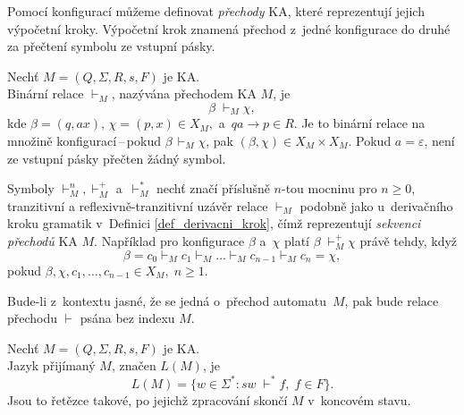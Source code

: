 Pomocí konfigurací můžeme definovat \emph{přechody} KA, které reprezentují jejich výpočetní kroky.
Výpočetní krok znamená přechod z~jedné konfigurace do druhé za přečtení symbolu ze vstupní pásky.
\begin{definition}\label{def_prechod_ka}
    Nechť $M = (Q, \Sigma, R, s, F)$ je KA.\\
    Binární relace $\vdash_{\scriptscriptstyle M}$, nazývána přechodem KA $M$, je
    \begin{equation*}
        \beta\; \vdash_{\scriptscriptstyle M}\chi,
    \end{equation*}
    kde $\beta = (q, ax),\, \chi = (p, x) \in X_M,$ a~$qa \rightarrow p \in R$.
    Je to binární relace na množině konfigurací\,--\,pokud $\beta\, \vdash_{\scriptscriptstyle M} \chi$, pak $(\beta, \chi) \in X_M \times X_M$.
    Pokud $a = \varepsilon$, není ze vstupní pásky přečten žádný symbol.
    
    Symboly $\vdash_{\scriptscriptstyle M}^n, \vdash_{\scriptscriptstyle M}^+$ a~$\vdash_{\scriptscriptstyle M}^*$ nechť značí příslušně $n$-tou mocninu pro $n \geq 0$, tranzitivní a reflexivně-tranzitivní uzávěr relace $\vdash_{\scriptscriptstyle M}$ podobně jako u~derivačního kroku gramatik v~Definici \ref{def_derivacni_krok}, čímž reprezentují \emph{sekvenci přechodů} KA $M$.
    Například pro konfigurace $\beta$ a~$\chi$ platí $\beta\; \vdash_{\scriptscriptstyle M}^+ \chi$ právě tehdy, když
    \begin{equation*}
        \beta = c_0 \vdash_{\scriptscriptstyle M} c_1 \vdash_{\scriptscriptstyle M} \ldots \vdash_{\scriptscriptstyle M} c_{n-1} \vdash_{\scriptscriptstyle M} c_{n} = \chi,
    \end{equation*}
    pokud $\beta, \chi, c_1, \ldots, c_{n-1} \in X_M,\; n \geq 1$.
\end{definition}

\begin{convention}
    Bude-li z~kontextu jasné, že se jedná o~přechod automatu~$M$, pak bude relace přechodu $\vdash$ psána bez indexu $M$.  
\end{convention}

\begin{definition}
    Nechť $M = (Q, \Sigma, R, s, F)$ je KA.\\
    Jazyk přijímaný $M$, značen $L(M)$, je
    \begin{equation*}
        L(M) = \{w \in \Sigma^*: sw\; \vdash^* f,\; f \in F\}.
    \end{equation*}
    Jsou to řetězce takové, po jejichž zpracování skončí $M$ v~koncovém stavu.
\end{definition}


